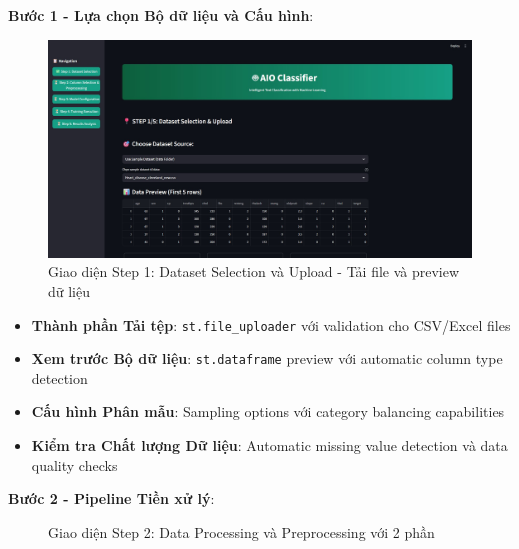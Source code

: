 \textbf{Bước 1 - Lựa chọn Bộ dữ liệu và Cấu hình}:

\begin{figure}[H]
    \centering
\includegraphics[width=\textwidth]{UI/Step 1.jpg}
\caption{Giao diện Step 1: Dataset Selection và Upload - Tải file và preview dữ liệu}
\label{fig:wizard_step1_real}
\end{figure}

\begin{itemize}
    \item \textbf{Thành phần Tải tệp}: \texttt{st.file\_uploader} với validation cho CSV/Excel files
    \item \textbf{Xem trước Bộ dữ liệu}: \texttt{st.dataframe} preview với automatic column type detection
    \item \textbf{Cấu hình Phân mẫu}: Sampling options với category balancing capabilities
    \item \textbf{Kiểm tra Chất lượng Dữ liệu}: Automatic missing value detection và data quality checks
\end{itemize}

\textbf{Bước 2 - Pipeline Tiền xử lý}:

\begin{figure}[H]
    \centering
{}
\quad
{}
\caption{Giao diện Step 2: Data Processing và Preprocessing với 2 phần}
\label{fig:wizard_step2_real}
\end{figure}

